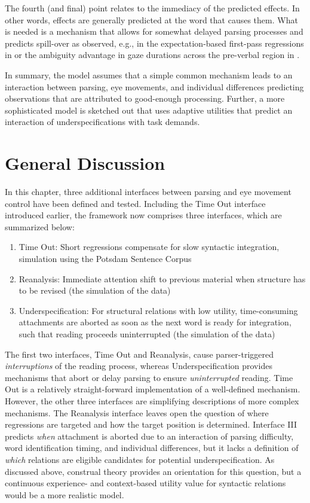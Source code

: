 \documentclass{cambridge7A}\usepackage[]{graphicx}\usepackage[]{color}
\begin{document}
The fourth (and final) point relates to the  immediacy of the predicted effects. In other words, effects are generally predicted at the word that causes them. What is needed is a mechanism that allows for somewhat delayed parsing processes and predicts spill-over as observed, e.g., in the expectation-based first-pass regressions in \cite{Staub2010a} or the ambiguity advantage in gaze durations across the pre-verbal region in \cite{MalsburgVasishth2013}. 

In summary, the model assumes that a simple common mechanism leads to an interaction between parsing, eye movements, and individual differences predicting observations that are attributed to good-enough processing. Further, a more sophisticated model is sketched out that uses adaptive utilities that predict an interaction of underspecifications with task demands.


\section{General Discussion}
In this chapter, three additional interfaces between parsing and eye movement control have been defined and tested. Including the Time Out interface introduced earlier, the framework now comprises three interfaces, which are summarized below:

\begin{enumerate}
\item Time Out: Short regressions compensate for slow syntactic integration, simulation using the Potsdam Sentence Corpus
\item Reanalysis: Immediate attention shift to previous material when structure has to be revised (the simulation of the \cite{Staub2010a} data)
\item Underspecification:  For structural relations with low utility, time-consuming attachments are aborted as soon as the next word is ready for integration, such that reading proceeds uninterrupted (the simulation of the \cite{MalsburgVasishth2013} data)
\end{enumerate}

The first two interfaces, Time Out and Reanalysis, cause parser-triggered \emph{interruptions} of the reading process, whereas Underspecification provides mechanisms that abort or delay parsing to ensure \emph{uninterrupted} reading.
Time Out is a relatively straight-forward implementation of a well-defined mechanism. However, the other three interfaces are simplifying descriptions of more complex mechanisms. The  Reanalysis interface leaves open the question of where regressions are targeted and how the target position is determined. 
Interface III predicts \emph{when} attachment is aborted due to an interaction of parsing difficulty, word identification timing, and individual differences, but it lacks a definition of \emph{which} relations are eligible candidates for potential underspecification. As discussed above, construal theory provides an orientation for this question, but a continuous experience- and context-based utility value for syntactic relations would be a more realistic model. 
\end{document}
